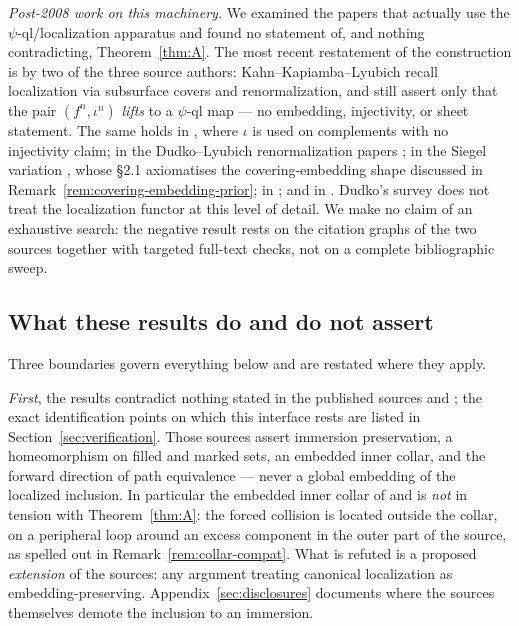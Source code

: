 \documentclass[11pt,reqno]{amsart}
\theoremstyle{definition}
\theoremstyle{remark}
\begin{document}
\emph{Post-2008 work on this machinery.}  We examined the papers that
actually use the $\psi$-ql/localization apparatus and found no
statement of, and nothing contradicting, Theorem~\ref{thm:A}.  The most
recent restatement of the construction is by two of the three source
authors: Kahn--Kapiamba--Lyubich \cite[\S\S2.2--2.3]{KKL26} recall
localization via subsurface covers and renormalization, and still
assert only that the pair $(f^{n},\iota^{n})$ \emph{lifts} to a
$\psi$-ql map --- no embedding, injectivity, or sheet statement.  The
same holds in \cite{KLElephant26}, where $\iota$ is used on
complements with no injectivity claim; in the Dudko--Lyubich
renormalization papers \cite{DL22,DL23}; in the Siegel variation
\cite{DLL25}, whose \S2.1 axiomatises the covering-embedding shape
discussed in Remark~\ref{rem:covering-embedding-prior}; in
\cite{CS15}; and in \cite{BLOT22}.  Dudko's survey \cite{Dudko25}
does not treat the localization functor at this level of detail.  We
make no claim of an exhaustive search: the negative result rests on the
citation graphs of the two sources together with targeted full-text
checks, not on a complete bibliographic sweep.

\subsection{What these results do and do not assert}
\label{subsec:scope}
Three boundaries govern everything below and are restated where they
apply.

\emph{First}, the results contradict nothing stated in the published
sources \cite{KahnPrimitive06} and \cite{KLDecorations08}; the exact
identification points on which this interface rests are listed in
Section~\ref{sec:verification}.  Those sources
assert immersion preservation, a homeomorphism on filled and marked
sets, an embedded inner collar, and the forward direction of path
equivalence --- never a global embedding of the localized inclusion.
In particular the embedded inner collar of
\cite[Theorem~7.3, p.~37]{KahnPrimitive06} and
\cite[Lemma~3.1, p.~10]{KLDecorations08} is \emph{not} in tension with
Theorem~\ref{thm:A}: the forced collision is located outside the
collar, on a peripheral loop around an excess component in the outer
part of the source, as spelled out in
Remark~\ref{rem:collar-compat}.  What is refuted is a proposed
\emph{extension} of the sources: any argument treating canonical
localization as embedding-preserving.
Appendix~\ref{sec:disclosures} documents where the sources themselves
demote the inclusion to an immersion.
\end{document}
